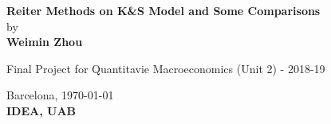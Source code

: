 \begin{center} 



\large{
\textbf{Reiter Methods on K\&S Model and Some Comparisons}\\
\vspace{0.5cm}
\Large {by}\\  
\vspace{0.25cm}
}
\textbf{Weimin Zhou}\\

\vspace{0.7cm}

\Large{Final Project for Quantitavie Macroeconomics (Unit 2) - 2018-19}\\
\vspace{0.7cm}

Barcelona,\,\,\today \\
\vspace{0.3cm}
\textbf{IDEA, UAB}		
   
\end{center}

  
